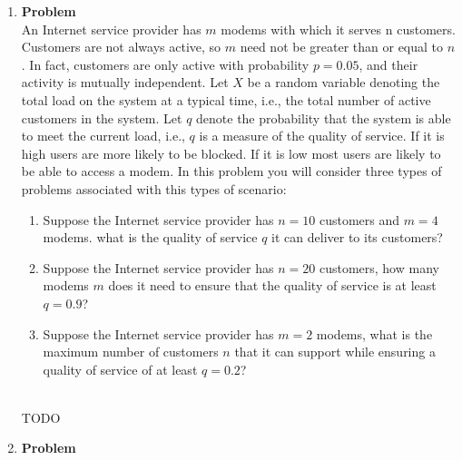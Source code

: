 \documentclass[12pt]{article}
\newenvironment{Ex}{\textbf{Problem}\vspace{.75em}\\}{}
\begin{document}
\begin{enumerate}
\begin{Ex}
\begin{solution}
\begin{equation}
          \label{eq:4-sol}
          E[g(X)] &= \sum 1 \\
          &= \infty \\
        \end{equation}
        The expected amount you would receive for guessing the correct
        coin toss number in infinite! Given unlimited resources, any
        amount of payment for this game would suffice.
      \end{solution}
    \end{Ex}
  \item
    \begin{Ex}
      An Internet service provider has $m$ modems with which it serves
      n customers. Customers are not always active, so $m$ need not be
      greater than or equal to $n$. In fact, customers are only active
      with probability $p = 0.05$, and their activity is mutually
      independent. Let $X$ be a random variable denoting the total
      load on the system at a typical time, i.e., the total number of
      active customers in the system. Let $q$ denote the probability
      that the system is able to meet the current load, i.e., $q$ is a
      measure of the quality of service. If it is high users are more
      likely to be blocked. If it is low most users are likely to be
      able to access a modem. In this problem you will consider three
      types of problems associated with this types of scenario:
      \begin{enumerate}
      \item Suppose the Internet service provider has $n = 10$
        customers and $m = 4$ modems. what is the quality of service
        $q$ it can deliver to its customers?
      \item Suppose the Internet service provider has $n = 20$
        customers, how many modems $m$ does it need to ensure that the
        quality of service is at least $q = 0.9$?
      \item Suppose the Internet service provider has $m = 2$ modems,
        what is the maximum number of customers $n$ that it can support
        while ensuring a quality of service of at least $q = 0.2$?
      \end{enumerate}
      \begin{solution} \hfill \\
        {\huge TODO}
      \end{solution}
    \end{Ex}
  \item
    \begin{Ex}

\end{Ex}
\end{enumerate}
\end{document}
